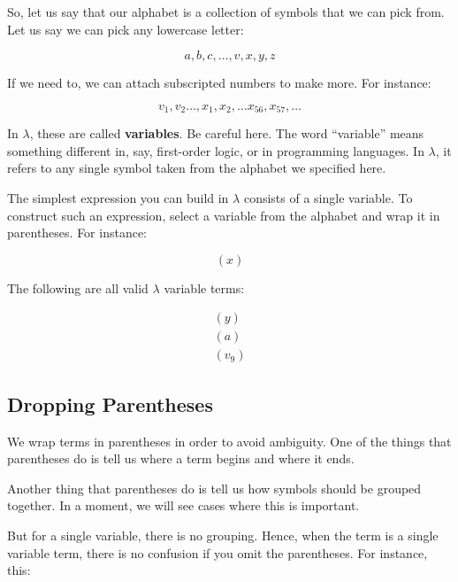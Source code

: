 \documentclass{book}
\numberwithin{equation}{chapter}
\newcommand{\vocab}{\textbf}
\begin{document}
So, let us say that our alphabet is a collection of symbols that we can pick from. Let us say we can pick any lowercase letter:

\begin{equation}
a, b, c, \ldots, v, x, y, z
\end{equation}

\noindent
If we need to, we can attach subscripted numbers to make more. For instance:

\begin{equation}
v_{1}, v_{2} \ldots, x_{1}, x_{2}, \ldots x_{56}, x_{57}, \ldots
\end{equation}

\noindent
In $\lambda$, these are called \vocab{variables}. Be careful here. The word ``variable'' means something different in, say, first-order logic, or in programming languages. In $\lambda$, it refers to any single symbol taken from the alphabet we specified here.

The simplest expression you can build in $\lambda$ consists of a single variable. To construct such an expression, select a variable from the alphabet and wrap it in parentheses. For instance:

\begin{equation}
(x)
\end{equation}

\noindent
The following are all valid $\lambda$ variable terms:

\begin{align}
(y) \\
(a) \\
(v_{9})
\end{align}


\subsection{Dropping Parentheses}

We wrap terms in parentheses in order to avoid ambiguity. One of the things that parentheses do is tell us where a term begins and where it ends.

Another thing that parentheses do is tell us how symbols should be grouped together. In a moment, we will see cases where this is important. 

But for a single variable, there is no grouping. Hence, when the term is a single variable term, there is no confusion if you omit the parentheses. For instance, this:
\end{document}
